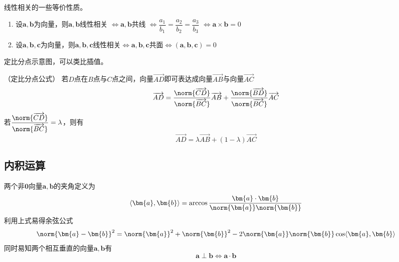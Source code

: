 \begin{theorem}
    线性相关的一些等价性质。
    \begin{enumerate}[(1)]
        \item 设$\bm{a},\bm{b}$为向量，则$\bm{a},\bm{b}$线性相关
              $\iff \bm{a},\bm{b}$共线
              $\iff \dfrac{a_1}{b_1}=\dfrac{a_2}{b_2}=\dfrac{a_3}{b_3}$
              $\iff \bm{a}\times\bm{b}=0$
        \item 设$\bm{a},\bm{b},\bm{c}$为向量，则$\bm{a},\bm{b},\bm{c}$线性相关$\iff\bm{a},\bm{b},\bm{c}$共面$\iff(\bm{a},\bm{b},\bm{c})=0$
    \end{enumerate}
\end{theorem}
\pagebreak
\begin{marginfigure}
    \centering
    \caption{定比分点示意图，可以类比插值。}
\end{marginfigure}
\begin{theorem}
    （定比分点公式）
    若$D$点在$B$点与$C$点之间，向量$\overrightarrow{AD}$即可表达成向量$\overrightarrow{AB}$与向量$\overrightarrow{AC}$
    \[ \overrightarrow{AD} = \frac{\norm{\overrightarrow{CD}}}{\norm{\overrightarrow{BC}}}\overrightarrow{AB} + \frac{\norm{\overrightarrow{BD}}}{\norm{\overrightarrow{BC}}}\overrightarrow{AC} \]
    若$\dfrac{\norm{\overrightarrow{CD}}}{\norm{\overrightarrow{BC}}} = \lambda$，则有
    \[ \overrightarrow{AD} = \lambda\overrightarrow{AB} + (1-\lambda)\overrightarrow{AC} \]
\end{theorem}

\subsection{内积运算}
两个非$\bm{0}$向量$\bm{a},\bm{b}$的夹角定义为
\begin{equation}
    \langle\bm{a},\bm{b}\rangle = \arccos \frac{\bm{a}\cdot\bm{b}}{\norm{\bm{a}} \norm{\bm{b}}}
\end{equation}
利用上式易得余弦公式
\begin{equation}
    \label{eq:余弦公式}
    \norm{\bm{a}-\bm{b}}^2 = \norm{\bm{a}}^2 + \norm{\bm{b}}^2 - 2\norm{\bm{a}}\norm{\bm{b}}\cos\langle\bm{a},\bm{b}\rangle
\end{equation}
同时易知两个相互垂直的向量$\bm{a},\bm{b}$有
\[ \bm{a}\perp\bm{b} \iff \bm{a}\cdot\bm{b} \]

